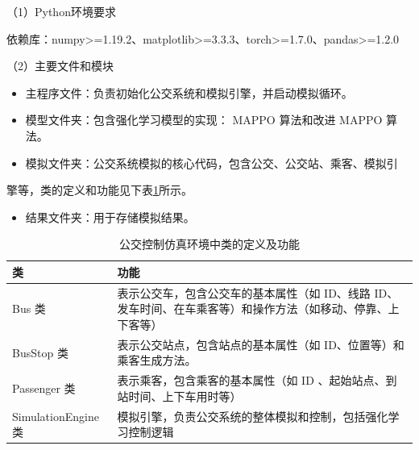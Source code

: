 （1）Python环境要求

依赖库：numpy>=1.19.2、matplotlib>=3.3.3、torch>=1.7.0、pandas>=1.2.0

（2）主要文件和模块

\begin{itemize}
    \item 主程序文件：负责初始化公交系统和模拟引擎，并启动模拟循环。
\end{itemize}

\begin{itemize}
    \item 模型文件夹：包含强化学习模型的实现： MAPPO 算法和改进 MAPPO 算法。
\end{itemize}

\begin{itemize}
    \item 模拟文件夹：公交系统模拟的核心代码，包含公交、公交站、乘客、模拟引
\end{itemize}
擎等，类的定义和功能见下表\ref{tab3-11}所示。

\begin{itemize}
    \item 结果文件夹：用于存储模拟结果。
\end{itemize}

\begin{table}[!ht]
\centering
\caption{公交控制仿真环境中类的定义及功能}
\label{tab3-11}
\begin{tabular}{>{\centering\arraybackslash}m{3.5cm} >{\raggedright\arraybackslash}m{9.6cm} }
\toprule
\textbf{类} & \textbf{功能} \\
\midrule
Bus 类 & 表示公交车，包含公交车的基本属性（如 ID、线路 ID、发车时间、在车乘客等）和操作方法（如移动、停靠、上下客等）\\
BusStop 类  & 表示公交站点，包含站点的基本属性（如 ID、位置等）和乘客生成方法。  \\
Passenger 类 & 表示乘客，包含乘客的基本属性（如 ID 、起始站点、到站时间、上下车用时等）\\
SimulationEngine 类 & 模拟引擎，负责公交系统的整体模拟和控制，包括强化学习控制逻辑\\
\bottomrule
\end{tabular}
\end{table}


